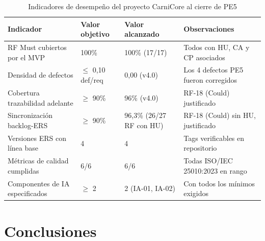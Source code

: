 \documentclass[11pt,a4paper]{article}
\begin{document}
\begin{table}[H]
\centering
\begin{tabular}{|p{4cm}|p{2.5cm}|p{2.5cm}|p{4cm}|}
\hline
\textbf{Indicador} & \textbf{Valor objetivo} & \textbf{Valor alcanzado} & \textbf{Observaciones} \\
\hline
RF Must cubiertos por el MVP & 100\% & 100\% (17/17) & Todos con HU, CA y CP asociados \\
\hline
Densidad de defectos & $\leq$ 0,10 def/req & 0,00 (v4.0) & Los 4 defectos PE5 fueron corregidos \\
\hline
Cobertura trazabilidad adelante & $\geq$ 90\% & 96\% (v4.0) & RF-18 (Could) justificado \\
\hline
Sincronización backlog-ERS & $\geq$ 90\% & 96,3\% (26/27 RF con HU) & RF-18 (Could) sin HU, justificado \\
\hline
Versiones ERS con línea base & 4 & 4 & Tags verificables en repositorio \\
\hline
Métricas de calidad cumplidas & 6/6 & 6/6 & Todas ISO/IEC 25010:2023 en rango \\
\hline
Componentes de IA especificados & $\geq$ 2 & 2 (IA-01, IA-02) & Con todos los mínimos exigidos \\
\hline
\end{tabular}
\caption{Indicadores de desempeño del proyecto CarniCore al cierre de PE5}
\label{tab:kpis}
\end{table}

\section{Conclusiones}
\label{sec:conclusiones}
\end{document}
